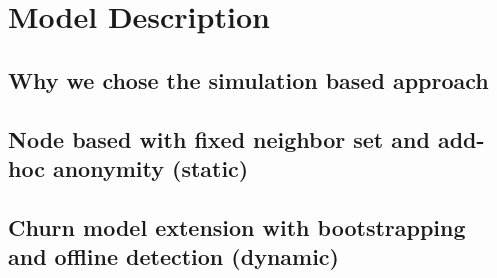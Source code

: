 \chapter{Model Description}

\section{Why we chose the simulation based approach}
\section{Node based with fixed neighbor set and add-hoc anonymity (static)}
\section{Churn model extension with bootstrapping and offline detection (dynamic)}
